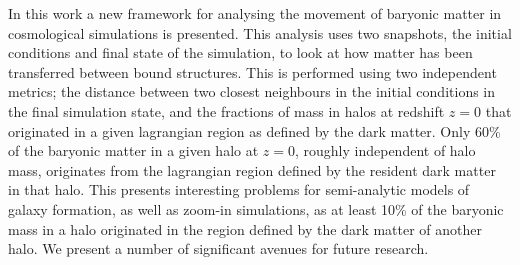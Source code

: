 In this work a new framework for analysing the movement of baryonic matter
in cosmological simulations is presented. This analysis uses two snapshots,
the initial conditions and final state of the simulation, to look at how
matter has been transferred between bound structures. This is performed using
two independent metrics; the distance between two closest neighbours in the
initial conditions in the final simulation state, and the fractions of mass
in halos at redshift $z=0$ that originated in a given lagrangian region as
defined by the dark matter. Only 60\% of the baryonic matter in a given halo
at $z=0$, roughly independent of halo mass, originates from the lagrangian
region defined by the resident dark matter in that halo. This presents
interesting problems for semi-analytic models of galaxy formation, as well
as zoom-in simulations, as at least 10\% of the baryonic mass in a halo
originated in the region defined by the dark matter of another halo. We present
a number of significant avenues for future research.
